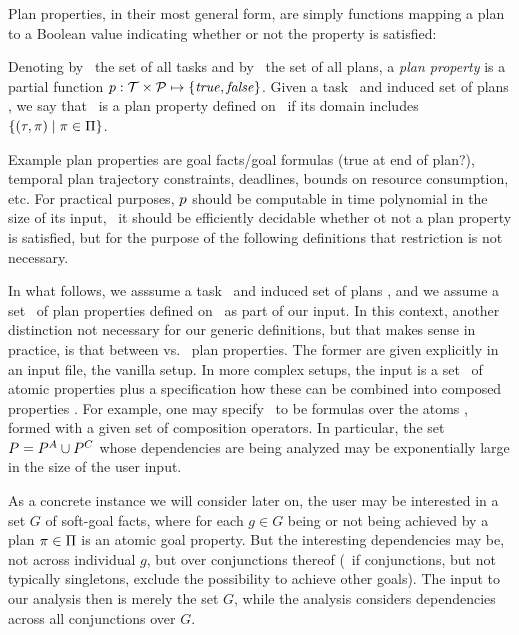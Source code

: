 Plan properties, in their most general form, are simply functions
mapping a plan to a Boolean value indicating whether or not the
property is satisfied:

\begin{definition}
Denoting by \alltasks\ the set of all tasks and by \allplans\ the set
of all plans, a \emph{plan property} is a partial function $p :
\cal T \times \cal P \mapsto \{\mathit{true}, \mathit{false}\}$. Given a task
\task\ and induced set of plans \plans, we say that \prop\ is a plan
property defined on \task\ if its domain includes $\{(\tau,\pi) \mid \pi
\in \Pi\}$.
\end{definition}

Example plan properties are goal facts/goal formulas (true at end of
plan?), temporal plan trajectory constraints, deadlines, bounds on
resource consumption, etc. For practical purposes, $p$ should be
computable in time polynomial in the size of its input, \ie\ it should
be efficiently decidable whether ot not a plan property is satisfied,
but for the purpose of the following definitions that restriction is
not necessary.

In what follows, we asssume a task \task\ and induced set of plans
\plans, and we assume a set \props\ of plan properties defined on
\task\ as part of our input. In this context, another distinction not
necessary for our generic definitions, but that makes sense in
practice, is that between  vs.\ 
plan properties. The former are given explicitly in an input file, the
vanilla setup. In more complex setups, the input is a set
\propsatom\ of atomic properties plus a specification how these can be
combined into composed properties \propscomp. For example, one may
specify \propscomp\ to be formulas over the atoms \propsatom, formed
with a given set of composition operators. In particular, the set
$P = P^A \cup P^C$ whose dependencies are being
analyzed may be exponentially large in the size of the user input.

As a concrete instance we will consider later on, the user may be
interested in a set $G$ of soft-goal facts, where for each $g \in G$
being or not being achieved by a plan $\pi \in \Pi$ is an atomic
goal property. But the interesting dependencies may be, not across
individual $g$, but over conjunctions thereof (\eg\ if conjunctions,
but not typically singletons, exclude the possibility to achieve other
goals). The input to our analysis then is merely the set $G$, while
the analysis considers dependencies across all conjunctions over $G$.

